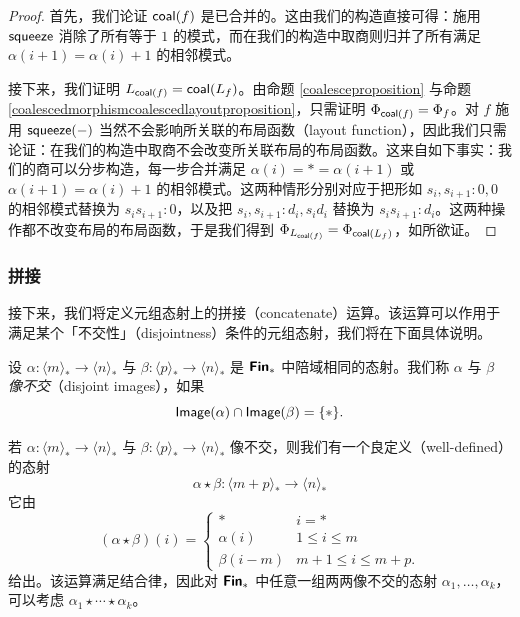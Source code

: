 \begin{proof}
首先，我们论证 $\mathsf{coal}(f)$ 是已合并的。这由我们的构造直接可得：施用 $\mathsf{squeeze}$ 消除了所有等于 $1$ 的模式，而在我们的构造中取商则归并了所有满足 $\alpha(i+1) = \alpha(i)+1$ 的相邻模式。 

    接下来，我们证明 $L_{\mathsf{coal}(f)} = \mathsf{coal}(L_f)$。由命题 \ref{coalesceproposition} 与命题 \ref{coalescedmorphismcoalescedlayoutproposition}，只需证明 $\Phi_{\mathsf{coal}(f)} = \Phi_f$。对 $f$ 施用 $\mathsf{squeeze}(-)$ 当然不会影响所关联的布局函数（layout function），因此我们只需论证：在我们的构造中取商不会改变所关联布局的布局函数。这来自如下事实：我们的商可以分步构造，每一步合并满足 $\alpha(i) = * = \alpha(i+1)$ 或 $\alpha(i+1) = \alpha(i) + 1$ 的相邻模式。这两种情形分别对应于把形如 $s_i,s_{i+1}:0,0$ 的相邻模式替换为 $s_is_{i+1}:0$，以及把 $s_i,s_{i+1}:d_i,s_id_i$ 替换为 $s_is_{i+1}:d_i$。这两种操作都不改变布局的布局函数，于是我们得到 $\Phi_{L_{\mathsf{coal}(f)}} = \Phi_{\mathsf{coal}(L_f)}$，如所欲证。
\end{proof}


\subsubsection{拼接}
\label{subsubsection.concatenate}

接下来，我们将定义元组态射上的拼接（concatenate）运算。该运算可以作用于满足某个「不交性」（disjointness）条件的元组态射，我们将在下面具体说明。

\begin{definition}\label{definitionofdisjointimagesinFin*}
    设 $\alpha:\langle m \rangle_* \to \langle n \rangle_*$ 与 $\beta:\langle p \rangle_* \to \langle n \rangle_*$ 是 ${\boldsymbol{\mathsf{Fin}}}_*$ 中陪域相同的态射。我们称 $\alpha$ 与 $\beta$ {\it 像不交}（disjoint images），如果
    \[
    \mathsf{Image}(\alpha) \cap \mathsf{Image}(\beta) = \{*\}.
    \]
\end{definition}

\begin{construction}
    若 $\alpha:\langle m \rangle_* \to \langle n \rangle_*$ 与 $\beta: \langle p \rangle_* \to \langle n \rangle_*$ 像不交，则我们有一个良定义（well-defined）的态射
    \[
    \alpha \star \beta: \langle m + p \rangle_* \to \langle n\rangle_*
    \]
    它由
    \[
    (\alpha \star \beta)(i) = \begin{cases}
    * & i = *\\
        \alpha(i) & 1 \leq i \leq m\\
        \beta(i-m) & m+1 \leq i \leq m+p.
    \end{cases}
    \]
    给出。该运算满足结合律，因此对 ${\boldsymbol{\mathsf{Fin}}}_*$ 中任意一组两两像不交的态射 $\alpha_1,\dots,\alpha_k$，可以考虑 $\alpha_1 \star \cdots \star \alpha_k$。
\end{construction}

